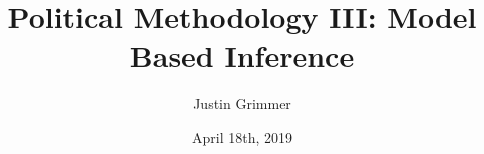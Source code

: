 \documentclass{beamer}
\title[Methodology III] %
{Political Methodology III: Model Based Inference}
\author{Justin Grimmer}
\institute[Stanford University]{Professor\\Department of Political Science \\  Stanford University}
\date{April 18th, 2019}
\begin{document}
\begin{frame}
\titlepage
\end{frame}








\end{document}
